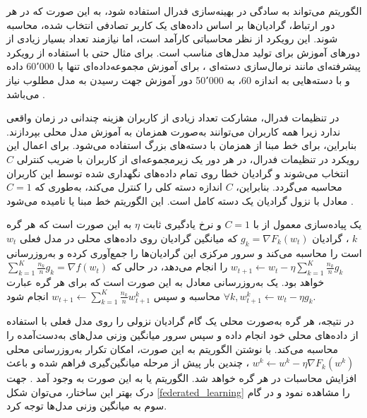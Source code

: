 الگوریتم
می‌تواند به سادگی در بهینه‌سازی فدرال استفاده شود، به این صورت که در هر دور ارتباط، گرادیان‌ها بر اساس داده‌های یک کاربر تصادفی انتخاب شده، محاسبه ‌شوند. این رویکرد از نظر محاسباتی کارآمد است، اما نیازمند تعداد بسیار زیادی از دورهای آموزش برای تولید مدل‌های مناسب است.
برای مثال حتی با استفاده از رویکرد پیشرفته‌ای مانند نرمال‌سازی دسته‌ای%
%
، برای آموزش مجموعه‌داده‌ای تنها با 60٬000 داده و
با دسته‌هایی به اندازه 60، به 50٬000 دور آموزش جهت رسیدن به مدل مطلوب نیاز می‌باشد
\cite{ioffe2015batch}.

در تنظیمات فدرال، مشارکت تعداد زیادی از کاربران هزینه چندانی در زمان واقعی ندارد زیرا همه کاربران می‌توانند به‌صورت همزمان به آموزش مدل محلی بپردازند. بنابراین، برای خط مبنا از
همزمان با دسته‌های بزرگ استفاده می‌شود. برای اعمال این رویکرد در تنظیمات فدرال، در هر دور یک زیرمجموعه‌ای از کاربران با ضریب کنترلی 
$C$
انتخاب می‌شوند و گرادیان خطا روی تمام داده‌های نگهداری شده توسط این کاربران محاسبه می‌گردد. بنابراین،
$C$
اندازه دسته کلی را کنترل می‌کند، به‌طوری که
$C = 1$
معادل با نزول گرادیان یک دسته کامل است. این الگوریتم خط مبنا
یا
نامیده می‌شود
\cite{mcmahan2017communication}.


یک پیاده‌سازی معمول از
با
$C = 1$
و نرخ یادگیری ثابت
$\eta$
به این صورت است که هر گره
$k$%
، گرادیان
$g_k=\nabla F_k\left(w_t\right)$
که میانگین گرادیان روی داده‌های محلی در مدل فعلی
$w_t$
است را محاسبه می‌کند و سرور مرکزی این گرادیان‌ها را جمع‌آوری کرده و به‌روزرسانی
$w_{t+1} \leftarrow w_t-\eta \sum_{k=1}^K \frac{n_k}{n} g_k$
را انجام می‌دهد، در حالی که
$\sum_{k=1}^K \frac{n_k}{n} g_k=\nabla f\left(w_t\right)$
خواهد بود. یک به‌روزرسانی معادل به این صورت است که برای هر گره عبارت
$\forall k, w_{t+1}^k \leftarrow w_t-\eta g_k$
محاسبه و سپس
$w_{t+1} \leftarrow \sum_{k=1}^K \frac{n_k}{n} w_{t+1}^k$
انجام شود.

در نتیجه، هر گره به‌صورت محلی یک گام گرادیان نزولی را روی مدل فعلی با استفاده از داده‌های محلی خود انجام داده و سپس سرور میانگین وزنی مدل‌های به‌دست‌آمده را محاسبه می‌کند. با نوشتن الگوریتم به این صورت، امکان تکرار به‌روزرسانی محلی
$w^k \leftarrow w^k-\eta \nabla F_k\left(w^k\right)$%
، چندین بار پیش از مرحله میانگین‌گیری فراهم شده و باعث افزایش محاسبات در هر گره خواهد شد. الگوریتم
یا
به این صورت به وجود آمد
\cite{mcmahan2017communication}.
جهت درک بهتر این ساختار، می‌توان شکل 
\ref{federated_learning} 
را مشاهده نمود و در گام سوم به میانگین وزنی مدل‌ها توجه کرد.

